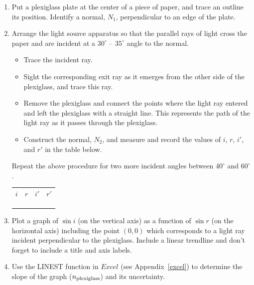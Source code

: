 \begin{enumerate}[labparts]
\item Put a plexiglass plate at the center of a piece of paper, and trace an outline
its position. Identify a normal, $N_1$, perpendicular to an edge of
the plate.

\item Arrange the light source apparatus so that the parallel rays of light
cross the paper and are incident at a $30^\circ$ -- $35^\circ$ angle
to the normal.

\begin{itemize}[nosep]
\item Trace the incident ray.

\item Sight the corresponding exit ray as it emerges from the other side of the
plexiglass, and trace this ray.

\item Remove the plexiglass and connect the points where the light ray entered 
and left the plexiglass with a straight line. This represents the path of the 
light ray as it passes through the plexiglass.

\item Construct the normal, $N_2$, and measure and record the values of $i$, $r$, $i'$, and $r'$ in the table below. 
\end{itemize}

Repeat the above procedure for two more incident angles between $40^\circ$ and $60^\circ$. 
\begin{center}
{\renewcommand{\arraystretch}{1.5}
\begin{tabular}{*{4}{|C{0.7in}}|}
\hline
$i$ & $r$ & $i'$ & $r'$ \\
\hhline{|=|=|=|=|}
& & &\\
\hline 
& & &\\
\hline 
& & &\\
\hline 
\end{tabular}
}
\end{center}

\item Plot a graph of $\sin i$ (on the vertical axis) as a function of $\sin r$ 
(on the horizontal axis) including the point $(0,0)$ which corresponds to a 
light ray incident perpendicular to the plexiglass. Include a linear trendline 
and don't forget to include a title and axis labels.
\item Use the LINEST function in $Excel$ (see Appendix~\ref{excel}) to 
determine the slope of the graph ($n_{\rm plexiglass}$) and its uncertainty.
\answerspace{35mm}


\end{enumerate}
